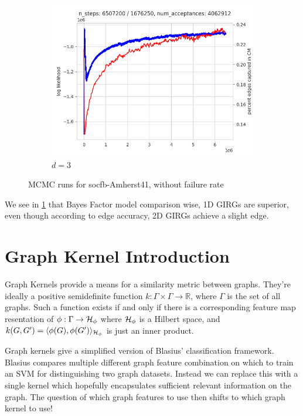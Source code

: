\begin{figure}
    \begin{subfigure}{0.49\textwidth}
      \centering
      \includegraphics[width=\linewidth]{figures/socfb-Amherst41-3d.png}
      \caption{$d=3$}
    \end{subfigure}
    \hfill
  
    \caption{MCMC runs for socfb-Amherst41, without failure rate}
    \label{fig:amherst_non_failure_mcmc}
\end{figure}

We see in \cref{fig:amherst_non_failure_mcmc} that Bayes Factor model comparison wise, 1D GIRGs are superior, even though according to edge accuracy, 2D GIRGs achieve a slight edge.


\section{Graph Kernel Introduction}
Graph Kernels provide a means for a similarity metric between graphs. They're ideally a positive semidefinite function $k: \Gamma \times \Gamma \rightarrow \mathbb{R}$, where $\Gamma$ is the set of all graphs. Such a function exists if and only if there is a corresponding feature map resentation of $\phi: \Gamma \to \mathcal{H}_\phi$ where $\mathcal{H}_\phi$ is a Hilbert space, and $k(G, G') = \langle \phi(G), \phi(G') \rangle_{\mathcal{H}_\phi}$ is just an inner product.

Graph kernels give a simplified version of Blasius' classification framework. Blasius compares multiple different graph feature combination on which to train an SVM for distinguishing two graph datasets. Instead we can replace this with a single kernel which hopefully encapsulates sufficient relevant information on the graph. The question of which graph features to use then shifts to which graph kernel to use!

